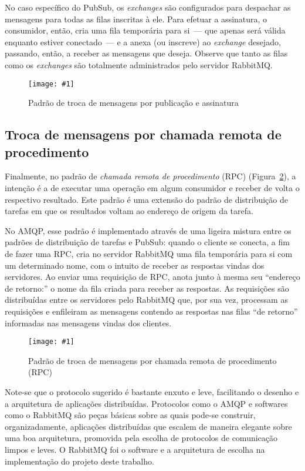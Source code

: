 \documentclass[ruledheader, 12pt]{abnt}
\newcommand{\figcustom}[4]{\par
	\begin{figure}[#3]
		\centering
		\texttt{[image: \#1]}
		\caption{\label{fig:#1}#2}
	\end{figure}
\par}
\newcommand{\figref}[1]{(Figura~\ref{fig:#1})}
\begin{document}
No caso específico do PubSub, os \emph{exchanges} são configurados para despachar as mensagens para todas as filas inscritas à ele. Para efetuar a assinatura, o consumidor, então, cria uma fila temporária para si~--- que apenas será válida enquanto estiver conectado~--- e a anexa (ou inscreve) ao \emph{exchange} desejado, passando, então, a receber as mensagens que deseja. Observe que tanto as filas como os \emph{exchanges} são totalmente administrados pelo servidor RabbitMQ.

\figcustom{rabbitmq-pubsub}{Padrão de troca de mensagens por publicação e assinatura}{tp}{1}

\subsection{Troca de mensagens por chamada remota de procedimento}


Finalmente, no padrão de \emph{chamada remota de procedimento} (RPC) \figref{rabbitmq-rpc}, a intenção é a de executar uma operação em algum consumidor e receber de volta o respectivo resultado. Este padrão é uma extensão do padrão de distribuição de tarefas em que os resultados voltam ao endereço de origem da tarefa.

No AMQP, esse padrão é implementado através de uma ligeira mistura entre os padrões de distribuição de tarefas e PubSub: quando o cliente se conecta, a fim de fazer uma RPC, cria no servidor RabbitMQ uma fila temporária para si com um determinado nome, com o intuito de receber as respostas vindas dos servidores. Ao enviar uma requisição de RPC, anota junto à mesma seu ``endereço de retorno:'' o nome da fila criada para receber as respostas. As requisições são distribuídas entre os servidores pelo RabbitMQ que, por sua vez, processam as requisições e enfileiram as mensagens contendo as respostas nas filas ``de retorno'' informadas nas mensagens vindas dos clientes.

\figcustom{rabbitmq-rpc}{Padrão de troca de mensagens por chamada remota de procedimento (RPC)}{p}{1}

\afterpage{\clearpage}

Note-se que o protocolo sugerido é bastante enxuto e leve, facilitando o desenho e a arquitetura de aplicações distribuídas. Protocolos como o AMQP e softwares como o RabbitMQ são peças básicas sobre as quais pode-se construir, organizadamente, aplicações distribuídas que escalem de maneira elegante sobre uma boa arquitetura, promovida pela escolha de protocolos de comunicação limpos e leves. O RabbitMQ foi o software e a arquitetura de escolha na implementação do projeto deste trabalho.
\end{document}
